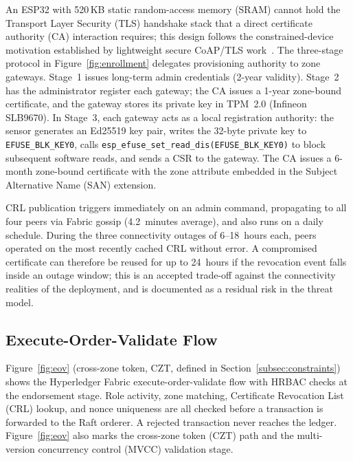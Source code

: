 \documentclass[a4paper,fleqn]{cas-dc}
\begin{document}
An ESP32 with 520\,KB static random-access memory (SRAM) cannot hold
the Transport Layer Security (TLS) handshake stack that a direct
certificate authority (CA) interaction requires; this design follows the
constrained-device motivation established by lightweight secure CoAP/TLS
work~\cite{raza2013lithe}. The three-stage protocol in
Figure~\ref{fig:enrollment} delegates provisioning authority to zone
gateways. Stage~1 issues long-term admin credentials (2-year validity).
Stage~2 has the administrator register each gateway; the CA issues a
1-year zone-bound certificate, and the gateway stores its private key
in TPM~2.0 (Infineon SLB9670). In Stage~3, each gateway acts as a
local registration authority: the sensor generates an Ed25519 key pair,
writes the 32-byte private key to \texttt{EFUSE\_BLK\_KEY0}, calls
\texttt{esp\_efuse\_set\_read\_dis(EFUSE\_BLK\_KEY0)} to block
subsequent software reads, and sends a CSR to the gateway. The CA issues
a 6-month zone-bound certificate with the zone attribute embedded in
the Subject Alternative Name (SAN) extension.

CRL publication triggers immediately on an admin command, propagating
to all four peers via Fabric gossip (4.2~minutes average), and also
runs on a daily schedule. During the three connectivity outages of
6--18~hours each, peers operated on the most recently cached CRL
without error. A compromised certificate can therefore be reused for
up to 24~hours if the revocation event falls inside an outage window;
this is an accepted trade-off against the connectivity realities of
the deployment, and is documented as a residual risk in
the threat model.

\subsection{Execute-Order-Validate Flow}
\label{subsec:eov}

Figure~\ref{fig:eov} (cross-zone token, CZT, defined in
Section~\ref{subsec:constraints}) shows the Hyperledger Fabric
execute-order-validate flow with HRBAC checks at the endorsement stage.
Role activity, zone matching, Certificate Revocation List (CRL) lookup,
and nonce uniqueness are all checked before a transaction is forwarded
to the Raft orderer. A rejected transaction never reaches the ledger.
Figure~\ref{fig:eov} also marks the cross-zone token (CZT) path and
the multi-version concurrency control (MVCC) validation stage.
\end{document}
